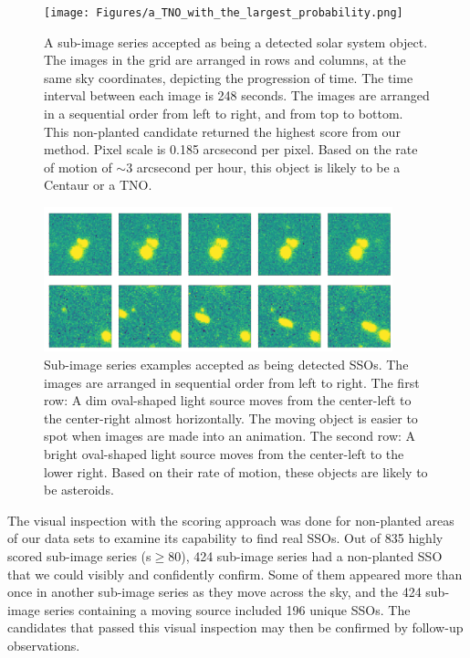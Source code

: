 \begin{figure}
    \centering
    \texttt{[image: Figures/a\_TNO\_with\_the\_largest\_probability.png]}
    \caption{A sub-image series accepted as being a detected solar system object.
    The images in the grid are arranged in rows and columns, at the same sky coordinates, depicting the progression of time.
    The time interval between each image is 248 seconds.
    The images are arranged in a sequential order from left to right, and from top to bottom.
    This non-planted candidate returned the highest score from our method.
    Pixel scale is 0.185 arcsecond per pixel.
    Based on the rate of motion of $\sim$3 arcsecond per hour, this object is likely to be a Centaur or a TNO.
    }
    \label{fig: a TNO with the largest probability}
\end{figure}

\begin{figure}
    \centering
    \includegraphics[width=0.9\textwidth,keepaspectratio]{Figures/SSO_examples.png}
    \caption{Sub-image series examples accepted as being detected SSOs.
    The images are arranged in sequential order from left to right.
    The first row: A dim oval-shaped light source moves from the center-left to the center-right almost horizontally.
    The moving object is easier to spot when images are made into an animation.
    The second row: A bright oval-shaped light source moves from the center-left to the lower right.
    Based on their rate of motion, these objects are likely to be asteroids.
    }
    \label{fig: SSO examples}
\end{figure}

The visual inspection with the scoring approach was done for non-planted areas of our data sets to examine its capability to find real SSOs.
Out of 835 highly scored sub-image series (s$\geq$80), 424 sub-image series had a non-planted SSO that we could visibly and confidently confirm.
Some of them appeared more than once in another sub-image series as they move across the sky, and the 424 sub-image series containing a moving source included 196 unique SSOs.
The candidates that passed this visual inspection may then be confirmed by follow-up observations.

